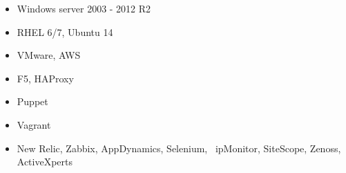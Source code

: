 \begin{multicols}{2}
	\begin{itemize}
		\item Windows server 2003 - 2012 R2
		\item RHEL 6/7, Ubuntu 14
		\item VMware, AWS
		\item F5, HAProxy
		\item Puppet
		\item Vagrant
		\item New Relic, Zabbix, AppDynamics, Selenium, ~ipMonitor, SiteScope, Zenoss, ActiveXperts
	\end{itemize}
	\vspace*{\fill}
\end{multicols}